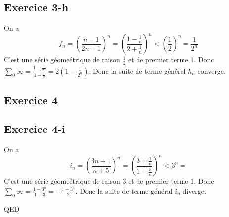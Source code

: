 \documentclass[]{book}
\theoremstyle{definition}
\begin{document}
\subsection*{Exercice 3-h}
On a 
$$f_n = \left( \frac{n-1}{2n+1} \right)^n = \left( \frac{1-\frac{1}{n}}{2+\frac{1}{n}} \right)^n < \left( \frac{1}{2} \right)^n = \frac{1}{2^n}$$
C'est une s\'erie g\'eome\'etrique de raison $\frac{1}{2}$ et de premier terme 1. Donc $\sum_{0}{\infty} = \frac{1-\frac{1}{2^n}}{1-\frac{1}{2}} = 2(1-\frac{1}{2^n})$. Donc la suite de terme g\'en\'eral $h_n$ converge.

\subsection*{Exercice 4}
\subsection*{Exercice 4-i}
On a 
$$i_n = \left( \frac{3n+1}{n+5} \right)^n = \left( \frac{3+\frac{1}{n}}{1+\frac{5}{n}} \right)^n < 3^n = $$
C'est une s\'erie g\'eome\'etrique de raison $3$ et de premier terme 1. Donc $\sum_{0}{\infty} = \frac{1-3^n}{1-3} = -\frac{1-3^n}{2}$. Donc la suite de terme g\'en\'eral $i_n$ diverge.


QED
\end{document}
